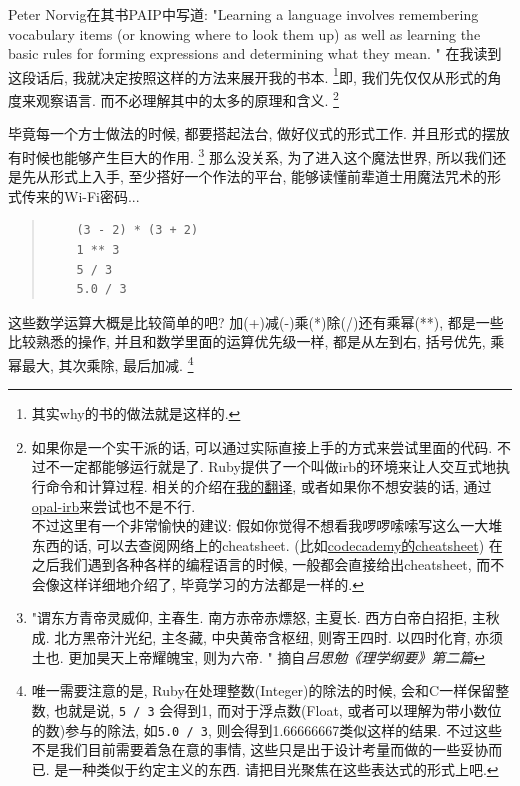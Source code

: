 
Peter Norvig在其书PAIP中写道: "Learning a language involves remembering vocabulary items (or knowing where to look them up) as well as learning the basic rules for forming expressions and determining what they mean. " 在我读到这段话后, 我就决定按照这样的方法来展开我的书本. \footnote{其实why的书的做法就是这样的. }即, 我们先仅仅从形式的角度来观察语言. 而不必理解其中的太多的原理和含义. \footnote{如果你是一个实干派的话, 可以通过实际直接上手的方式来尝试里面的代码. 不过不一定都能够运行就是了. Ruby提供了一个叫做irb的环境来让人交互式地执行命令和计算过程. 相关的介绍在\href{https://li-yiyang.github.io/ruby/why's_(poignant)_guide_to_ruby/why's-poignant-guide/}{我的翻译}, 或者如果你不想安装的话, 通过\href{https://github.com/fkchang/opal-irb}{opal-irb}来尝试也不是不行. \\ 不过这里有一个非常愉快的建议: 假如你觉得不想看我啰啰嗦嗦写这么一大堆东西的话, 可以去查阅网络上的cheatsheet. (比如\href{https://www.codecademy.com/learn/learn-ruby/modules/learn-ruby-introduction-to-ruby-u/cheatsheet}{codecademy的cheatsheet}) 在之后我们遇到各种各样的编程语言的时候, 一般都会直接给出cheatsheet, 而不会像这样详细地介绍了, 毕竟学习的方法都是一样的. }

毕竟每一个方士做法的时候, 都要搭起法台, 做好仪式的形式工作. 并且形式的摆放有时候也能够产生巨大的作用. \footnote{"谓东方青帝灵威仰, 主春生. 南方赤帝赤熛怒, 主夏长. 西方白帝白招拒, 主秋成. 北方黑帝汁光纪, 主冬藏, 中央黄帝含枢纽, 则寄王四时. 以四时化育, 亦须土也. 更加昊天上帝耀魄宝, 则为六帝. " 摘自\emph{吕思勉《理学纲要》第二篇}} 那么没关系, 为了进入这个魔法世界, 所以我们还是先从形式上入手, 至少搭好一个作法的平台, 能够读懂前辈道士用魔法咒术的形式传来的Wi-Fi密码... 

\begin{quotation}
  \begin{verbatim}
    (3 - 2) * (3 + 2)
    1 ** 3
    5 / 3
    5.0 / 3
  \end{verbatim}
\end{quotation}

这些数学运算大概是比较简单的吧? 加(+)减(-)乘(*)除(/)还有乘幂(**), 都是一些比较熟悉的操作, 并且和数学里面的运算优先级一样, 都是从左到右, 括号优先, 乘幂最大, 其次乘除, 最后加减. \footnote{唯一需要注意的是, Ruby在处理整数(Integer)的除法的时候, 会和C一样保留整数, 也就是说, \texttt{5 / 3} 会得到1, 而对于浮点数(Float, 或者可以理解为带小数位的数)参与的除法, 如\texttt{5.0 / 3}, 则会得到1.66666667类似这样的结果. 不过这些不是我们目前需要着急在意的事情, 这些只是出于设计考量而做的一些妥协而已. 是一种类似于约定主义的东西. 请把目光聚焦在这些表达式的形式上吧. }


